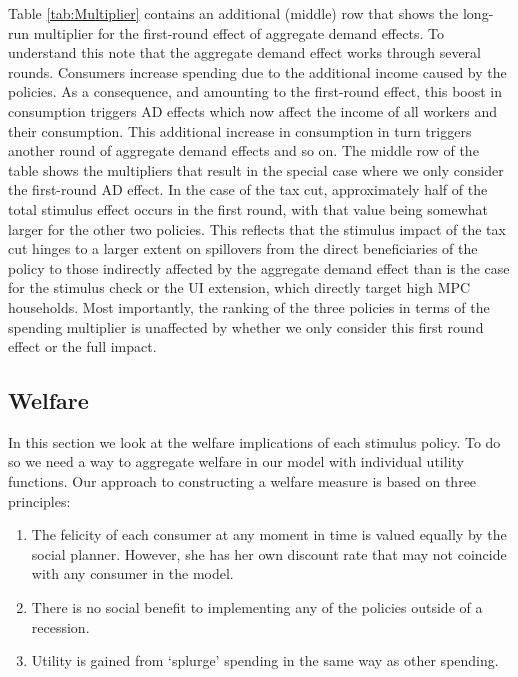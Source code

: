 \documentclass[../HAFiscal]{subfiles}
\begin{document}
Table \ref{tab:Multiplier} contains an additional (middle) row that shows the long-run multiplier for the first-round effect of aggregate demand effects. To understand this note that the aggregate demand effect works through several rounds. Consumers increase spending due to the additional income caused by the policies. As a consequence, and amounting to the first-round effect, this boost in consumption triggers AD effects which now affect the income of all workers and their consumption. This additional increase in consumption in turn triggers another round of aggregate demand effects and so on. The middle row of the table shows the multipliers that result in the special case where we only consider the first-round AD effect. 
In the case of the tax cut, approximately half of the total stimulus effect occurs in the first round, with that value being somewhat larger for the other two policies. This reflects that the stimulus impact of the tax cut hinges to a larger extent on spillovers from the direct beneficiaries of the policy to those indirectly affected by the aggregate demand effect than is the case for the stimulus check or the UI extension, which directly target high MPC households. Most importantly, the ranking of the three policies in terms of the spending multiplier is unaffected by whether we only consider this first round effect or the full impact. 


\subsection{Welfare}
\label{sec:welfare}

In this section we look at the welfare implications of each stimulus policy. To do so we need a way to aggregate welfare in our model with individual utility functions. Our approach to constructing a welfare measure is based on three principles:
\begin{enumerate}
	\item The felicity of each consumer at any moment in time is valued equally by the social planner.  However, she has her own discount rate that may not coincide with any consumer in the model.
	\item There is no social benefit to implementing any of the policies outside of a recession. 
	\item Utility is gained from `splurge' spending in the same way as other spending.
\end{enumerate} 
\end{document}
